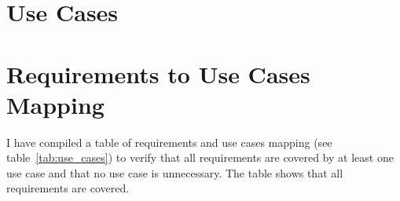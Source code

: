 

\section{Use Cases}





\section{Requirements to Use Cases Mapping}
I have compiled a table of requirements and use cases mapping (see table~\ref{tab:use_cases}) to verify that all requirements are covered by at least one use case and that no use case is unnecessary.
The table shows that all requirements are covered.

